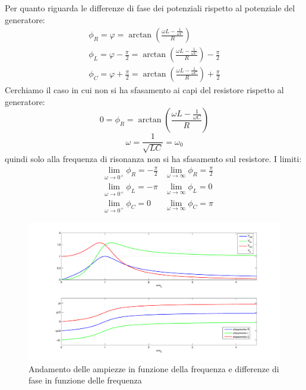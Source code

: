 Per quanto riguarda le differenze di fase dei potenziali rispetto al potenziale del generatore:
\begin{subequations}
\begin{gather}
\phi_R=\varphi=\arctan\left(\frac{\omega L-\frac{1}{\omega C}}{R}\right)\\
\phi_L=\varphi-\frac{\pi}{2}=\arctan\left(\frac{\omega L-\frac{1}{\omega C}}{R}\right)-\frac{\pi}{2}\\
\phi_C=\varphi+\frac{\pi}{2}=\arctan\left(\frac{\omega L-\frac{1}{\omega C}}{R}\right)+\frac{\pi}{2}
\end{gather}
\end{subequations}
Cerchiamo il caso in cui non si ha sfasamento ai capi del resistore rispetto al generatore:
\begin{equation*}
0=\phi_R=\arctan\left(\frac{\omega L-\frac{1}{\omega C}}{R}\right)
\end{equation*}
\begin{equation}
\omega=\frac{1}{\sqrt{LC}}=\omega_0
\end{equation}
quindi solo alla frequenza di risonanza non si ha sfasamento sul resistore. I limiti:
\begin{subequations}
\begin{align}
&\lim_{\omega\to 0^+}\phi_R=-\frac{\pi}{2}&\lim_{\omega\to\infty}\phi_R=\frac{\pi}{2}\\
&\lim_{\omega\to 0^+}\phi_L=-\pi&\lim_{\omega\to\infty}\phi_L=0\\
&\lim_{\omega\to 0^+}\phi_C=0&\lim_{\omega\to\infty}\phi_C=\pi
\end{align}
\end{subequations}
\begin{figure}[htbp]
\centering
\includegraphics[scale=0.45]{immagini/fisica2/RLC_01}
\caption{Andamento delle ampiezze in funzione della frequenza e differenze di fase in funzione delle frequenza}
\end{figure}
